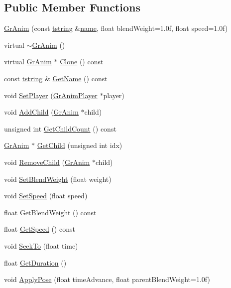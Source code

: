 \subsection*{Public Member Functions}
\begin{CompactItemize}
\item 
\hyperlink{class_gr_anim_e95ba9277c302b62a1aa920250850c78}{GrAnim} (const \hyperlink{common__afx_8h_816fa58fd77499b0edb2c69ebe803d5c}{tstring} \&\hyperlink{glext__bak_8h_bb62efe59ccdd153ce42e1a418352209}{name}, float blendWeight=1.0f, float speed=1.0f)
\item 
virtual \hyperlink{class_gr_anim_c2e84ed21513c92654d033c015003260}{$\sim$GrAnim} ()
\item 
virtual \hyperlink{class_gr_anim}{GrAnim} $\ast$ \hyperlink{class_gr_anim_2964f4d1c2a3b51ff301b03590d26bac}{Clone} () const 
\item 
const \hyperlink{common__afx_8h_816fa58fd77499b0edb2c69ebe803d5c}{tstring} \& \hyperlink{class_gr_anim_16847f80539915f15a8670858cc08461}{GetName} () const 
\item 
void \hyperlink{class_gr_anim_d3ec0402580565cd063b139be74c2337}{SetPlayer} (\hyperlink{class_gr_anim_player}{GrAnimPlayer} $\ast$player)
\item 
void \hyperlink{class_gr_anim_83ac6be64b6a8ea93ad373326c9ab2ee}{AddChild} (\hyperlink{class_gr_anim}{GrAnim} $\ast$child)
\item 
unsigned int \hyperlink{class_gr_anim_8a6f16cd1038ce6d266986df04e6be63}{GetChildCount} () const 
\item 
\hyperlink{class_gr_anim}{GrAnim} $\ast$ \hyperlink{class_gr_anim_db3b4e7c91b07cb1aa949ddfa4cb4211}{GetChild} (unsigned int idx)
\item 
void \hyperlink{class_gr_anim_812d2e9d6246923c1c6d3d93b3444a48}{RemoveChild} (\hyperlink{class_gr_anim}{GrAnim} $\ast$child)
\item 
void \hyperlink{class_gr_anim_6e433bc1fcdaea899f78bd51f2e0ffa7}{SetBlendWeight} (float weight)
\item 
void \hyperlink{class_gr_anim_c027292f0a1cc72c12f616a5e328ea50}{SetSpeed} (float speed)
\item 
float \hyperlink{class_gr_anim_f6af73be3d38c2ea62c5dac6a5d65196}{GetBlendWeight} () const 
\item 
float \hyperlink{class_gr_anim_de03c33c2cb87f9b72243afc77504973}{GetSpeed} () const 
\item 
void \hyperlink{class_gr_anim_7aa48461719836a8a2ad7ffff67a958c}{SeekTo} (float time)
\item 
float \hyperlink{class_gr_anim_6863fbadf721b2848290a320b617dc78}{GetDuration} ()
\item 
void \hyperlink{class_gr_anim_2ba496a35bd9ffef0eddd31b1f540d89}{ApplyPose} (float timeAdvance, float parentBlendWeight=1.0f)
\end{CompactItemize}
